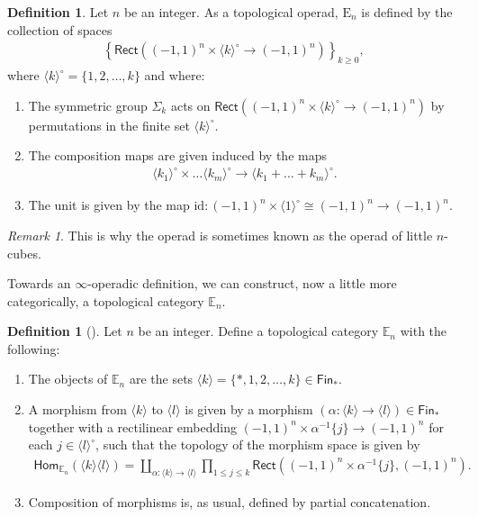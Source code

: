 \documentclass[12pt,a4paper]{article}
\newcounter{counter} \numberwithin{counter}{section}
\theoremstyle{definition}
\newtheorem{definition}[counter]{Definition}
\theoremstyle{plain}
\theoremstyle{remark}
\newtheorem{remark}[counter]{Remark}
\begin{document}
\begin{appendices}
\begin{definition}
    Let $n$ be an integer. As a topological operad, $\mathrm{E}_n$ is defined by the collection of spaces
    \begin{align}
        \left\{ \mathsf{Rect}((-1,1)^n \times \langle k \rangle^\circ \rightarrow (-1,1)^n)\right\}_{k \geq 0},
    \end{align}
    where $\langle k \rangle^\circ = \{1, 2, \dots, k\}$ and where:
    \begin{enumerate}
        \item The symmetric group $\Sigma_k$ acts on $\mathsf{Rect}((-1,1)^n \times \langle k \rangle^\circ \rightarrow (-1,1)^n)$ by permutations in the finite set $\langle k \rangle^\circ$.
        \item The composition maps are given induced by the maps
        \begin{align}
            \langle k_1 \rangle^\circ \times \dots \langle k_m \rangle^\circ \xrightarrow{\quad} \langle k_1 + \dots + k_m \rangle^\circ.
        \end{align}
        \item The unit is given by the map $\mathrm{id} : (-1,1)^n \times \langle 1 \rangle^\circ \cong (-1,1)^n \rightarrow (-1,1)^n$.
    \end{enumerate}
\end{definition}

\begin{remark}
    This is why the operad is sometimes known as the operad of little $n$-cubes.
\end{remark}

Towards an $\infty$-operadic definition, we can construct, now a little more categorically, a topological category $\mathbb{E}_n$.

\begin{definition}[{\cite[def.5.1.0.2]{lurie_ha}}]
    Let $n$ be an integer. Define a topological category $\mathbb{E}_n$ with the following:
    \begin{enumerate}
        \item The objects of $\mathbb{E}_n$ are the sets $\langle k \rangle = \{ *, 1, 2, \dots, k\} \in \mathsf{Fin}_*$.
        \item A morphism from $\langle k \rangle$ to $\langle l \rangle$ is given by a morphism $(\alpha : \langle k \rangle \rightarrow \langle l \rangle) \in \mathsf{Fin}_*$ together with a rectilinear embedding $(-1,1)^n \times \alpha^{-1}\{j\} \xrightarrow{\quad} (-1,1)^n$ for each $j \in \langle l \rangle^\circ$, such that the topology of the morphism space is given by 
        \begin{align}
            \mathsf{Hom}_{\mathbb{E}_n}(\langle k \rangle \langle l \rangle) = \coprod_{\alpha : \langle k \rangle \rightarrow \langle l \rangle} \prod_{1 \leq j \leq k} \mathsf{Rect} ((-1,1)^n \times \alpha^{-1}\{ j\}, (-1,1)^n).
        \end{align}
        \item Composition of morphisms is, as usual, defined by partial concatenation.
    \end{enumerate}
\end{definition}


\end{appendices}
\end{document}
